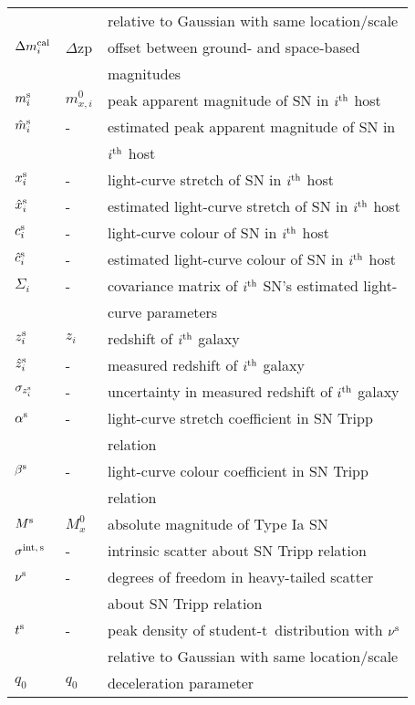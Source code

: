 \documentclass[a4paper,fleqn,usenatbib]{mnras}
\newcommand{\tpeak}{t}
\newcommand{\studentdist}{student-t}
\newcommand{\dmcal}{\ensuremath{\Delta m_i^{\rm cal}}}
\newcommand{\Mstds}{\ensuremath{M^{\rm s}}}
\newcommand{\sigints}{\ensuremath{\sigma^{\rm int,\,s}}}
\newcommand{\xsalts}{\ensuremath{x_i^{\rm s}}}
\newcommand{\csalts}{\ensuremath{c_i^{\rm s}}}
\newcommand{\xsalthats}{\ensuremath{\hat{x}_i^{\rm s}}}
\newcommand{\csalthats}{\ensuremath{\hat{c}_i^{\rm s}}}
\newcommand{\alphas}{\ensuremath{\alpha^{\rm s}}}
\newcommand{\betas}{\ensuremath{\beta^{\rm s}}}
\newcommand{\msup}{\ensuremath{m_i^{\rm s}}}
\newcommand{\mhats}{\ensuremath{\hat{m}_i^{\rm s}}}
\newcommand{\decel}{\ensuremath{q_0}}
\newcommand{\zs}{\ensuremath{z_i^{\rm s}}}
\newcommand{\zhats}{\ensuremath{\hat{z}_i^{\rm s}}}
\newcommand{\dofs}{\ensuremath{\nu^{\rm s}}}
\newcommand{\tpeaks}{\ensuremath{\tpeak^{\rm s}}}
\begin{document}
{\begin{table}
\begin{tabular}{lll}
 & & relative to Gaussian with same location/scale\\
$\dmcal$ &
  $\Delta$zp &
      offset between ground- and space-based \\
 & & magnitudes \\
\hline
$\msup$ &
  $m_{x,i}^0$ &
      peak apparent magnitude of SN in $i^{\rm th}$ host \\
$\mhats$ &
  - &
      estimated peak apparent magnitude of SN in \\
 & & $i^{\rm th}$ host \\
$\xsalts$ &
  - &
      light-curve stretch of SN in $i^{\rm th}$ host \\
$\xsalthats$ &
  - &
      estimated light-curve stretch of SN in $i^{\rm th}$ host \\
$\csalts$ &
  - &
      light-curve colour of SN in $i^{\rm th}$ host \\
$\csalthats$ &
  - &
      estimated light-curve colour of SN in $i^{\rm th}$ host \\
$\Sigma_i$ &
  - &
      covariance matrix of $i^{\rm th}$ SN's estimated light- \\
 & & curve parameters \\
$\zs$ &
  $z_i$ &
      redshift of $i^{\rm th}$ galaxy \\
$\zhats$ &
  - &
      measured redshift of $i^{\rm th}$ galaxy \\
$\sigma_{\zs}$ &
  - &
      uncertainty in measured redshift of $i^{\rm th}$ galaxy \\
$\alphas$ &
  - &
      light-curve stretch coefficient in SN Tripp \\
 & & relation \\
$\betas$ &
  - &
      light-curve colour coefficient in SN Tripp \\
 & & relation \\
$\Mstds$ &
  $M_x^0$ &
      absolute magnitude of Type Ia SN \\
$\sigints$ &
  - &
      intrinsic scatter about SN Tripp relation \\
$\dofs$ &
  - &
      degrees of freedom in heavy-tailed scatter \\
 & & about SN Tripp relation \\
$\tpeaks$ &
  - &
      peak density of \studentdist\ distribution with $\dofs$ \\
 & & relative to Gaussian with same location/scale\\
\hline
$\decel$ &
  $\decel$ &
      deceleration parameter \\

\end{tabular}
\end{table}}
\end{document}
